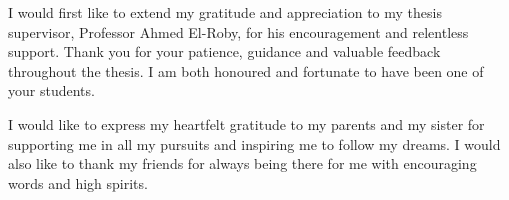 I would first like to extend my gratitude and appreciation to my 
thesis supervisor, Professor Ahmed El-Roby, for his encouragement and relentless support. Thank you for your patience, guidance and valuable feedback throughout the thesis. I am both honoured and fortunate to have been one of your students. 

I would like to express my heartfelt gratitude to my parents and my sister for supporting me in all my pursuits and inspiring me to follow my dreams. I would also like to thank my friends for always being there for me with encouraging words and high spirits.
